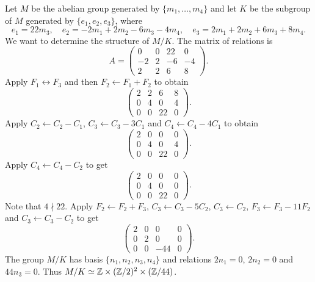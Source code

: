 \begin{example}
Let $M$ be the abelian group generated by $\{m_1,\dots,m_4\}$ and let $K$
be the subgroup of $M$ generated by 
$\{e_1,e_2,e_3\}$, where 
\[
e_1=22m_3,\quad
e_2=-2m_1+2m_2-6m_3-4m_4,\quad
e_3=2m_1+2m_2+6m_3+8m_4.
\]
We want to determine the structure of $M/K$. 
The matrix of relations is  
\[
A=\begin{pmatrix}
	0 & 0 & 22 & 0\\
	-2 & 2 & -6 & -4\\
	2 & 2 & 6 & 8
\end{pmatrix}.
\]
Apply $F_1\leftrightarrow F_3$ and then $F_2\leftarrow F_1+F_2$ to obtain 
\[
\begin{pmatrix}
	2 & 2 & 6 & 8\\
	0 & 4 & 0 & 4\\
	0 & 0 & 22 & 0
\end{pmatrix}.
\]
Apply $C_2\leftarrow C_2-C_1$, $C_3\leftarrow C_3-3C_1$ and
$C_4\leftarrow C_4-4C_1$ to obtain 
\[
\begin{pmatrix}
	2 & 0 & 0 & 0\\
	0 & 4 & 0 & 4\\
	0 & 0 & 22 & 0
\end{pmatrix}.
\]
Apply $C_4\leftarrow C_4-C_2$ to get 
\[
\begin{pmatrix}
	2 & 0 & 0 & 0\\
	0 & 4 & 0 & 0\\
	0 & 0 & 22 & 0
\end{pmatrix}. 
\]
Note that $4\nmid 22$. Apply $F_2\leftarrow F_2+F_3$, $C_3\leftarrow C_3-5C_2$, $C_3\leftarrow C_2$, $F_3\leftarrow F_3-11F_2$ and 
$C_3\leftarrow C_3-C_2$ to get 
\[
\begin{pmatrix}
	2 & 0 & 0 & 0\\
	0 & 2 & 0 & 0\\
	0 & 0 & -44 & 0
\end{pmatrix}.
\]
The group $M/K$ has basis $\{n_1,n_2,n_3,n_4\}$ and relations 
$2n_1=0$, $2n_2=0$ and $44n_3=0$. Thus $M/K\simeq\mathbb{Z}\times (\mathbb{Z}/2)^2\times (\mathbb{Z}/44)$. 
\end{example}

